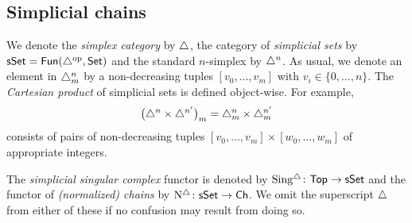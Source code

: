 %
%
%





\subsection{Simplicial chains}

We denote the \textit{simplex category} by $\triangle$, the category of \textit{simplicial sets} by $\mathsf{sSet} = \mathsf{Fun}(\triangle^{\mathrm{op}}, \mathsf{Set})$ and the standard $n$-simplex by $\triangle^n$.
As usual, we denote an element in $\triangle^n_m$ by a non-decreasing tuples $[v_0, \dots, v_m]$ with $v_i \in \{0, \dots, n\}$.
The \textit{Cartesian product} of simplicial sets is defined object-wise.
For example,
\[
\big(\triangle^n \times \triangle^{n^\prime}\big)_m = \triangle^n_m \times \triangle^{n^\prime}_m
\]
consists of pairs of non-decreasing tuples $[v_0, \dots, v_m] \times [w_0, \dots, w_m]$ of appropriate integers.

The \textit{simplicial singular complex} functor is denoted by $\operatorname{Sing^{\triangle}} \colon \mathsf{Top} \to \mathsf{sSet}$ and the functor of \textit{(normalized) chains} by $\operatorname{N^{\triangle}} \colon \mathsf{sSet} \to \mathsf{Ch}$.
We omit the superscript $\triangle$ from either of these if no confusion may result from doing so.

